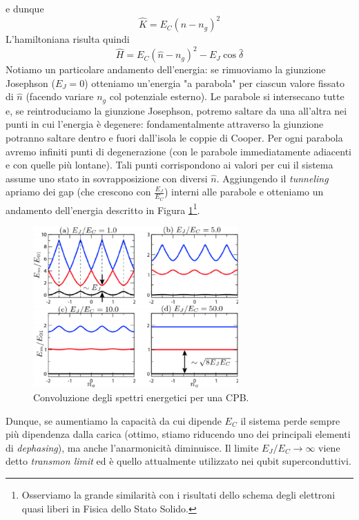 e dunque
\begin{equation*}
    \hat K = E_C(\hat n-n_g)^2
\end{equation*}
L'hamiltoniana risulta quindi
\begin{equation*}
    \hat H = E_C ( \hat n - n_g)^2 - E_J \cos \hat \delta
\end{equation*}
Notiamo un particolare andamento dell'energia: se rimuoviamo la giunzione Josephson ($E_J=0$) otteniamo un'energia "a parabola" per ciascun valore fissato di $\hat n$ (facendo variare $n_g$ col potenziale esterno). Le parabole si intersecano tutte e, se reintroduciamo la giunzione Josephson, potremo saltare da una all'altra nei punti in cui l'energia è degenere: fondamentalmente attraverso la giunzione potranno saltare dentro e fuori dall'isola le coppie di Cooper. Per ogni parabola avremo infiniti punti di degenerazione (con le parabole immediatamente adiacenti e con quelle più lontane).
Tali punti corrispondono ai valori per cui il sistema assume uno stato in sovrapposizione con diversi $\hat n$. Aggiungendo il \textit{tunneling} apriamo dei gap (che crescono con $\frac{E_J}{E_C}$) interni alle parabole e otteniamo un andamento dell'energia descritto in Figura \ref{fig:spectrum_CPB}\footnote{Osserviamo la grande similarità con i risultati dello schema degli elettroni quasi liberi in Fisica dello Stato Solido.}.
\begin{figure}[H]
    \centering
    \includegraphics[width=0.7\textwidth]{images/Energy-spectrum-CPB.png}
    \caption{Convoluzione degli spettri energetici per una CPB.}
    \label{fig:spectrum_CPB}
\end{figure}
\noindent Dunque, se aumentiamo la capacità da cui dipende $E_C$ il sistema perde sempre più dipendenza dalla carica (ottimo, stiamo riducendo uno dei principali elementi di \textit{dephasing}), ma anche l'anarmonicità diminuisce. Il limite $E_J / E_C \rightarrow \infty$ viene detto \textit{transmon limit} ed è quello attualmente utilizzato nei qubit superconduttivi.